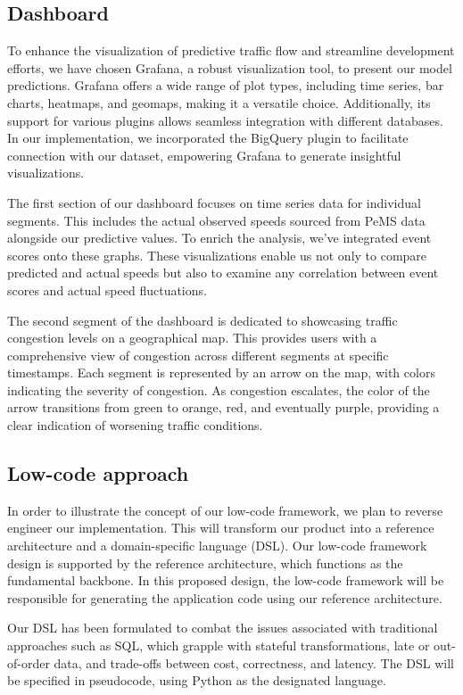 \subsection{Dashboard}
To enhance the visualization of predictive traffic flow and streamline development efforts, we have chosen Grafana, a robust visualization tool, to present our model predictions. Grafana offers a wide range of plot types, including time series, bar charts, heatmaps, and geomaps, making it a versatile choice. Additionally, its support for various plugins allows seamless integration with different databases. In our implementation, we incorporated the BigQuery plugin to facilitate connection with our dataset, empowering Grafana to generate insightful visualizations.

The first section of our dashboard focuses on time series data for individual segments. This includes the actual observed speeds sourced from PeMS data alongside our predictive values. To enrich the analysis, we've integrated event scores onto these graphs. These visualizations enable us not only to compare predicted and actual speeds but also to examine any correlation between event scores and actual speed fluctuations.

The second segment of the dashboard is dedicated to showcasing traffic congestion levels on a geographical map. This provides users with a comprehensive view of congestion across different segments at specific timestamps. Each segment is represented by an arrow on the map, with colors indicating the severity of congestion. As congestion escalates, the color of the arrow transitions from green to orange, red, and eventually purple, providing a clear indication of worsening traffic conditions.
 

\subsection{Low-code approach}
In order to illustrate the concept of our low-code framework, we plan to reverse engineer our implementation. This will transform our product into a reference architecture and a domain-specific language (DSL). Our low-code framework design is supported by the reference architecture, which functions as the fundamental backbone. In this proposed design, the low-code framework will be responsible for generating the application code using our reference architecture. 

Our DSL has been formulated to combat the issues associated with traditional approaches such as SQL, which grapple with stateful transformations, late or out-of-order data, and trade-offs between cost, correctness, and latency. The DSL will be specified in pseudocode, using Python as the designated language. 

